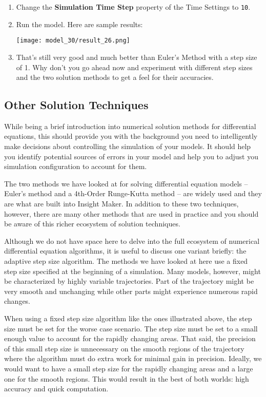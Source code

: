 \documentclass[]{memoir}
\makeatletter
\def\maxwidth{\ifdim\Gin@nat@width>\linewidth\linewidth
\else\Gin@nat@width\fi}
\let\Oldincludegraphics\includegraphics
\renewcommand{\includegraphics}[1]{\Oldincludegraphics[width=\maxwidth]{#1}}
\newcommand{\e}[1]{\texttt{#1}}
\renewcommand{\a}[1]{\textbf{#1}}
\makeatother
\begin{document}
\begin{oframed}
\begin{enumerate}
\item  Change the \a{Simulation Time Step} property of the Time Settings to \e{10}.
\item Run the model. Here are sample results:\par \begin{minipage}{\linewidth}  \centering \texttt{[image: model\_30/result\_26.png]}
\end{minipage}
\item 

That's still very good and much better than Euler's Method with a step size of 1. Why don't you go ahead now and experiment with different step sizes and the two solution methods to get a feel for their accuracies.



\end{enumerate} \end{oframed}

\subsection{Other Solution Techniques}

While being a brief introduction into numerical solution methods for
differential equations, this should provide you with the background you
need to intelligently make decisions about controlling the simulation of
your models. It should help you identify potential sources of errors in
your model and help you to adjust you simulation configuration to
account for them.

The two methods we have looked at for solving differential equation
models -- Euler's method and a 4th-Order Runge-Kutta method -- are
widely used and they are what are built into Insight Maker. In addition
to these two techniques, however, there are many other methods that are
used in practice and you should be aware of this richer ecosystem of
solution techniques.

Although we do not have space here to delve into the full ecosystem of
numerical differential equation algorithms, it is useful to discuss one
variant briefly: the adaptive step size algorithm. The methods we have
looked at here use a fixed step size specified at the beginning of a
simulation. Many models, however, might be characterized by highly
variable trajectories. Part of the trajectory might be very smooth and
unchanging while other parts might experience numerous rapid changes.

When using a fixed step size algorithm like the ones illustrated above,
the step size must be set for the worse case scenario. The step size
must be set to a small enough value to account for the rapidly changing
areas. That said, the precision of this small step size is unnecessary
on the smooth regions of the trajectory where the algorithm must do
extra work for minimal gain in precision. Ideally, we would want to have
a small step size for the rapidly changing areas and a large one for the
smooth regions. This would result in the best of both worlds: high
accuracy and quick computation.
\end{document}
